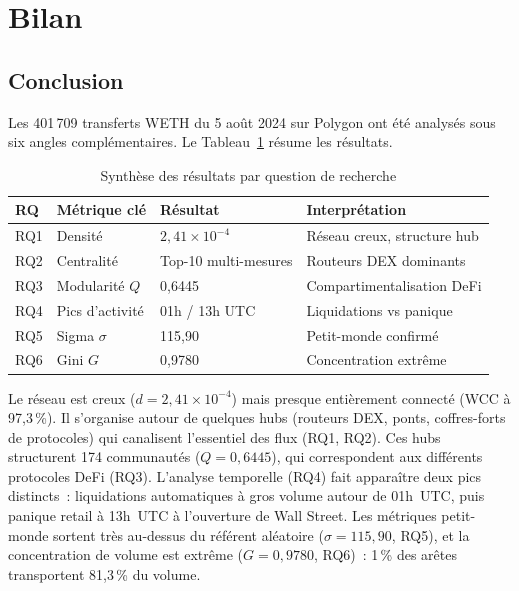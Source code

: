 
\section{Bilan}
\label{sec:bilan}

\subsection{Conclusion}
\label{subsec:conclusion}

Les 401\,709 transferts WETH du 5 ao\^ut 2024 sur Polygon ont \'et\'e
analys\'es sous six angles compl\'ementaires. Le Tableau~\ref{tab:synthese_rq}
r\'esume les r\'esultats.

\begin{table}[H]
\centering
\caption{Synth\`ese des r\'esultats par question de recherche}
\label{tab:synthese_rq}
\begin{tabular}{llll}
\toprule
\textbf{RQ} & \textbf{M\'etrique cl\'e} & \textbf{R\'esultat}
  & \textbf{Interpr\'etation} \\
\midrule
RQ1 & Densit\'e & $2{,}41 \times 10^{-4}$
  & R\'eseau creux, structure hub \\
RQ2 & Centralit\'e & Top-10 multi-mesures
  & Routeurs DEX dominants \\
RQ3 & Modularit\'e $Q$ & 0{,}6445
  & Compartimentalisation DeFi \\
RQ4 & Pics d'activit\'e & 01h / 13h UTC
  & Liquidations vs panique \\
RQ5 & Sigma $\sigma$ & 115{,}90
  & Petit-monde confirm\'e \\
RQ6 & Gini $G$ & 0{,}9780
  & Concentration extr\^eme \\
\bottomrule
\end{tabular}
\end{table}

Le r\'eseau est creux ($d = 2{,}41 \times 10^{-4}$) mais presque enti\`erement
connect\'e (WCC \`a 97{,}3\,\%). Il s'organise autour de quelques hubs (routeurs
DEX, ponts, coffres-forts de protocoles) qui canalisent l'essentiel des flux
(RQ1, RQ2). Ces hubs structurent 174 communaut\'es ($Q = 0{,}6445$), qui
correspondent aux diff\'erents protocoles DeFi (RQ3). L'analyse temporelle
(RQ4) fait appara\^itre deux pics distincts~: liquidations automatiques \`a
gros volume autour de 01h~UTC, puis panique retail \`a 13h~UTC \`a
l'ouverture de Wall Street. Les m\'etriques petit-monde sortent tr\`es
au-dessus du r\'ef\'erent al\'eatoire ($\sigma = 115{,}90$, RQ5), et la
concentration de volume est extr\^eme ($G = 0{,}9780$, RQ6)~: 1\,\% des
ar\^etes transportent 81{,}3\,\% du volume.

